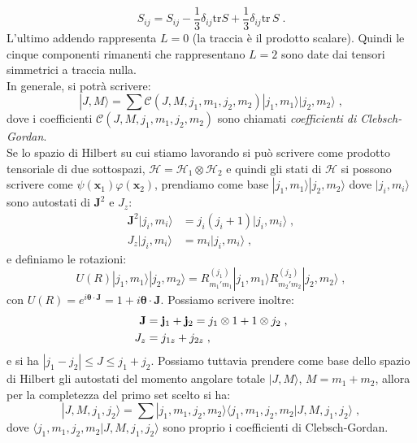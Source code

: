 \documentclass[12pt,a4paper]{report}
\theoremstyle{definition}
\newcommand{\ham}{\mathcal{H}}
\numberwithin{equation}{section}
\newcommand{\bra}{\langle}
\newcommand{\ket}{\rangle}
\newcommand{\tr}{\mathrm{tr}}
\begin{document}
\begin{equation}
S_{ij}=S_{ij}-\frac{1}{3}\delta_{ij}\tr S+\frac{1}{3}\delta_{ij}\tr\, S\;.
\end{equation}
L'ultimo addendo rappresenta $L=0$ (la traccia è il prodotto scalare). Quindi le cinque componenti rimanenti che rappresentano $L=2$ sono date dai tensori simmetrici a traccia nulla. \\
In generale, si potrà scrivere:
\begin{equation}
|J,M\ket=\sum \mathcal{C}(J,M,j_1,m_1,j_2,m_2)|j_1,m_1\ket|j_2,m_2\ket\;,
\end{equation}
dove i coefficienti $\mathcal{C}(J,M,j_1,m_1,j_2,m_2)$ sono chiamati \textit{coefficienti di Clebsch-Gordan}. \\
Se lo spazio di Hilbert su cui stiamo lavorando si può scrivere come prodotto tensoriale di due sottospazi, $\ham=\ham_1 \otimes \ham_2$ e quindi gli stati di $\ham$ si possono scrivere come $\psi(\mathbf{x}_1)\varphi(\mathbf{x}_2)$, prendiamo come base $|j_1,m_1\ket|j_2,m_2\ket$ dove $|j_i,m_i\ket$ sono autostati di $\mathbf{J}^2$ e $J_z$:
\begin{align*}
\mathbf{J}^2|j_i,m_i\ket &= j_i(j_i+1)|j_i,m_i\ket\;, \\
J_z|j_i,m_i\ket&=m_i|j_i,m_i\ket\;,
\end{align*}
e definiamo le rotazioni:
\begin{equation}
U(R)|j_1,m_1\ket|j_2,m_2\ket=R^{(j_1)}_{m_1'm_1}|j_1,m_1\ket R^{(j_2)}_{m_2'm_2}|j_2,m_2\ket\;,
\end{equation}
con $U(R)=e^{i\boldsymbol{\theta}\cdot\mathbf{J}}=1+i\boldsymbol{\theta}\cdot\mathbf{J}$. Possiamo scrivere inoltre:
\begin{align}
\mathbf{J}&=\mathbf{j}_1+\mathbf{j}_2=j_1\otimes 1+ 1\otimes j_2 \notag\;, \\
J_z &= j_{1z}+j_{2z}\;,
\end{align}
e si ha $|j_1-j_2|\le J\le j_1+j_2$. Possiamo tuttavia prendere come base dello spazio di Hilbert gli autostati del momento angolare totale $|J,M\ket$, $M=m_1+m_2$, allora per la completezza del primo set scelto si ha:
\begin{equation}
|J,M,j_1,j_2\ket=\sum |j_1,m_1,j_2,m_2\ket\bra j_1,m_1,j_2,m_2|J,M,j_1,j_2\ket\;,
\end{equation}
dove $\bra j_1,m_1,j_2,m_2|J,M,j_1,j_2\ket$ sono proprio i coefficienti di Clebsch-Gordan.
\end{document}
